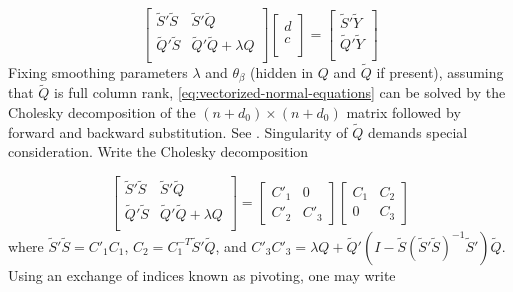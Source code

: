 \documentclass[12pt]{article}
\newcommand{\tildeS}{\tilde{S}}
\newcommand{\tildeY}{\tilde{Y}}
\newcommand{\tildeQ}{\tilde{Q}}
\theoremstyle{definition}
\begin{document}
\begin{equation} \label{eq:vectorized-normal-equations}
\begin{bmatrix}
\tildeS'\tildeS & \tildeS'\tildeQ \\
\tildeQ'\tildeS & \tildeQ'\tildeQ + \lambda Q\\
\end{bmatrix}
\begin{bmatrix}
d\\
c\\
\end{bmatrix}
= \begin{bmatrix}
\tildeS'\tildeY \\
 \tildeQ'\tildeY\\
\end{bmatrix}
\end{equation}
\bigskip
Fixing smoothing parameters $\lambda$ and $\theta_\beta$ (hidden in $Q$ and $\tildeQ$ if present), assuming that $\tildeQ$ is full column rank, \ref{eq:vectorized-normal-equations} can be solved by the Cholesky decomposition of the $\left( n + d_0 \right) \times \left( n + d_0 \right)$ matrix followed by forward and backward substitution. See \citet{golub2012matrix}. Singularity of $\tildeQ$ demands special consideration. Write the Cholesky decomposition

\begin{equation} \label{eq:normal-equation-cholesky}
\begin{bmatrix}
\tildeS'\tildeS & \tildeS'\tildeQ \\
\tildeQ'\tildeS & \tildeQ'\tildeQ + \lambda Q\\
\end{bmatrix}
= \begin{bmatrix}
C'_1 & 0 \\
C'_2  & C'_3 
\end{bmatrix}
\begin{bmatrix}
C_1 & C_2 \\
0  & C_3 
\end{bmatrix}
\end{equation}
\noindent
where $\tildeS'\tildeS = C'_1 C_1$, $C_2 = C_1^{-T} \tildeS' \tildeQ$, and $C'_3 C'_3 = \lambda Q +  \tildeQ'\left( I - \tildeS\left( \tildeS' \tildeS \right)^{-1} \tildeS' \right)\tildeQ$. Using an exchange of indices known as pivoting, one may write 
\end{document}
